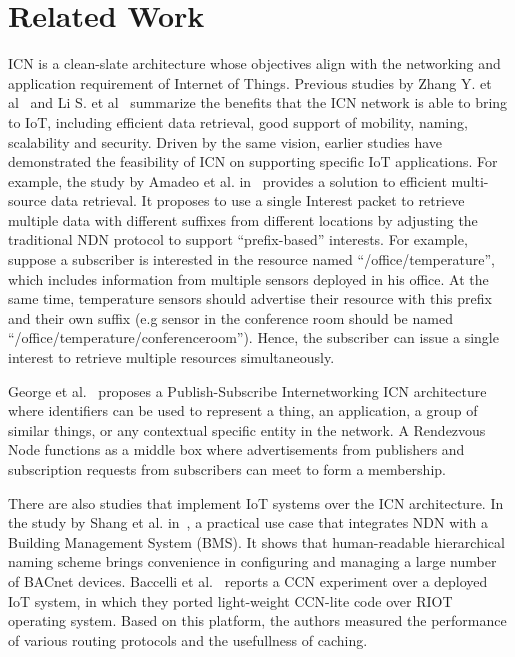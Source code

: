 \section{Related Work}
\label{sec:related}

ICN is a clean-slate architecture whose objectives align with the networking and application requirement of Internet of Things. Previous studies by Zhang Y. et al~\cite{zhang2013icn} and Li S. et al~\cite{li2014comparative} summarize the benefits that the ICN network is able to bring to IoT, including efficient data retrieval, good support of mobility, naming, scalability and security. Driven by the same vision, earlier studies have demonstrated the feasibility of ICN on supporting specific IoT applications. For example, the study by Amadeo et al. in~\cite{amadeo2014multi} provides a solution to efficient multi-source data retrieval. It proposes to use a single Interest packet to retrieve multiple data with different suffixes from different locations by adjusting the traditional NDN protocol to support ``prefix-based'' interests. For example, suppose a subscriber is interested in the resource named ``/office/temperature'', which includes  information from multiple sensors deployed in his office. At the same time, temperature sensors should advertise their resource with this prefix and their own suffix (e.g sensor in the conference room should be named ``/office/temperature/conferenceroom''). Hence, the subscriber can issue a single interest to retrieve multiple resources simultaneously.


George et al.~\cite{polyzos2015building} proposes a Publish-Subscribe Internetworking ICN architecture
where identifiers can be used to represent a thing, an application, a group of similar things, or any contextual specific entity in the network. A Rendezvous Node functions as a middle box where advertisements from publishers and subscription requests from subscribers can meet to form a membership.


There are also studies that implement IoT systems over the ICN architecture. In the study by Shang et al. in~\cite{shang2014securing}, a practical use case that integrates NDN with a Building Management System (BMS). It shows that human-readable hierarchical naming scheme brings convenience in configuring and managing a large number of BACnet devices. Baccelli et al.~\cite{baccelli2014information} reports a CCN experiment  over a deployed IoT system, in which they ported light-weight CCN-lite code over RIOT operating system. Based on this platform, the authors measured the performance of various routing protocols and the usefullness of caching.

